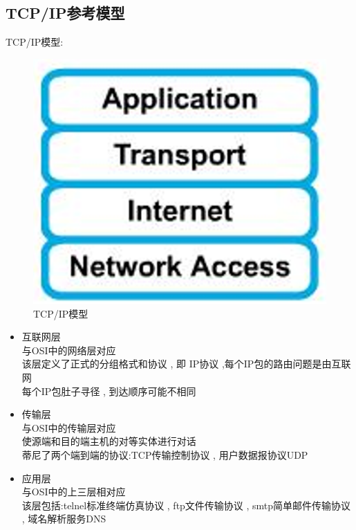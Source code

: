 \documentclass[UTF8,a4paper]{ctexart}
\begin{document}
  \subsection{TCP/IP参考模型}
  TCP/IP模型:
  \begin{figure}[H]
    \centering
    \includegraphics[scale = 0.3]{assets/jisuanjiwangluo_0c1c0.png}
    \caption{TCP/IP模型}
  \end{figure}

  \begin{itemize}
    \item 互联网层\\
  与OSI中的网络层对应\\
  该层定义了正式的分组格式和协议 , 即 IP协议 ,每个IP包的路由问题是由互联网\\
  每个IP包肚子寻径 , 到达顺序可能不相同
  \item 传输层\\
  与OSI中的传输层对应\\
  使源端和目的端主机的对等实体进行对话\\
  蒂尼了两个端到端的协议:TCP传输控制协议 , 用户数据报协议UDP
  \item 应用层\\
  与OSI中的上三层相对应\\
  该层包括:telnel标准终端仿真协议 , ftp文件传输协议 , smtp简单邮件传输协议 , 域名解析服务DNS
  \end{itemize}
\end{document}
